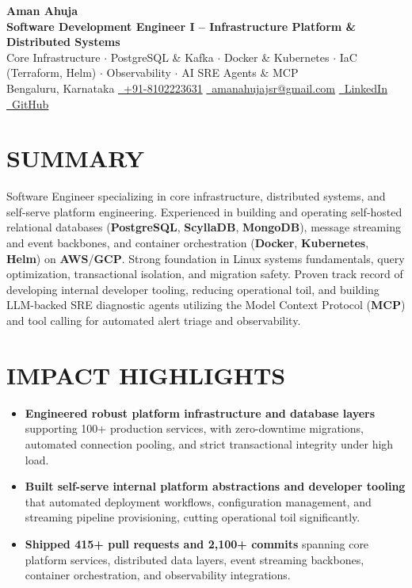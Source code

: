 \documentclass[letterpaper,10pt]{article}
\newcommand{\resumeDash}{\rule[0.6ex]{0.55em}{1.2pt}}
\newcommand{\resumeItem}[1]{\item\small{#1}}
\newcommand{\resumeItemListStart}{\begin{itemize}[label={\resumeDash}, leftmargin=0.18in, itemsep=1pt, topsep=2pt, parsep=0pt]}
\newcommand{\resumeItemListEnd}{\end{itemize}\vspace{-4pt}}
\begin{document}
\begin{center}
  {\Huge \textbf{Aman Ahuja}} \\ \vspace{1pt}
  {\large \textbf{Software Development Engineer I -- Infrastructure Platform \& Distributed Systems}} \\ \vspace{0pt}
  {\small Core Infrastructure $\cdot$ PostgreSQL \& Kafka $\cdot$ Docker \& Kubernetes $\cdot$ IaC (Terraform, Helm) $\cdot$ Observability $\cdot$ AI SRE Agents \& MCP} \\ \vspace{1pt}
  \small Bengaluru, Karnataka \textbar{}
  \href{tel:+918102223631}{\raisebox{-0.1\height}\faPhone\ +91-8102223631} \textbar{}
  \href{mailto:amanahujajsr@gmail.com}{\raisebox{-0.2\height}\faEnvelope\ amanahujajsr@gmail.com} \textbar{}
  \href{https://linkedin.com/in/itsamanahuja}{\raisebox{-0.2\height}\faLinkedin\ LinkedIn} \textbar{}
  \href{https://github.com/AmanDev-Code}{\raisebox{-0.2\height}\faGithub\ GitHub}
\end{center}

\vspace{-10pt}
\section{SUMMARY}
{\small Software Engineer specializing in core infrastructure, distributed systems, and self-serve platform engineering. Experienced in building and operating self-hosted relational databases (\textbf{PostgreSQL}, \textbf{ScyllaDB}, \textbf{MongoDB}), message streaming and event backbones, and container orchestration (\textbf{Docker}, \textbf{Kubernetes}, \textbf{Helm}) on \textbf{AWS}/\textbf{GCP}. Strong foundation in Linux systems fundamentals, query optimization, transactional isolation, and migration safety. Proven track record of developing internal developer tooling, reducing operational toil, and building LLM-backed SRE diagnostic agents utilizing the Model Context Protocol (\textbf{MCP}) and tool calling for automated alert triage and observability.}

\section{IMPACT HIGHLIGHTS}
\resumeItemListStart
  \resumeItem{\textbf{Engineered robust platform infrastructure and database layers} supporting 100+ production services, with zero-downtime migrations, automated connection pooling, and strict transactional integrity under high load.}
  \resumeItem{\textbf{Built self-serve internal platform abstractions and developer tooling} that automated deployment workflows, configuration management, and streaming pipeline provisioning, cutting operational toil significantly.}
  \resumeItem{\textbf{Shipped 415+ pull requests and 2,100+ commits} spanning core platform services, distributed data layers, event streaming backbones, container orchestration, and observability integrations.}
\resumeItemListEnd
\end{document}
